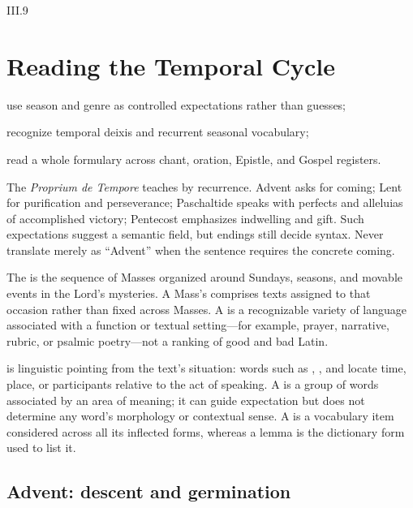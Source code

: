 \begin{courseunit}{III.9}
\chapter{Reading the Temporal Cycle}

\begin{learningobjectives}
  \item use season and genre as controlled expectations rather than guesses;
  \item recognize temporal deixis and recurrent seasonal vocabulary;
  \item read a whole formulary across chant, oration, Epistle, and Gospel registers.
\end{learningobjectives}

The \emph{Proprium de Tempore} teaches by recurrence. Advent asks for coming;
Lent for purification and perseverance; Paschaltide speaks with perfects and
alleluias of accomplished victory; Pentecost emphasizes indwelling and gift.
Such expectations suggest a semantic field, but endings still decide syntax.
Never translate  merely as ``Advent'' when the sentence requires
the concrete coming.

The  is the sequence of Masses organized around Sundays,
seasons, and movable events in the Lord's mysteries. A Mass's 
comprises texts assigned to that occasion rather than fixed across Masses. A
 is a recognizable variety of language associated with a
function or textual setting---for example, prayer, narrative, rubric, or
psalmic poetry---not a ranking of good and bad Latin.

 is linguistic pointing from the text's situation: words such as
, , and  locate time, place, or
participants relative to the act of speaking. A  is a
group of words associated by an area of meaning; it can guide expectation but
does not determine any word's morphology or contextual sense. A 
is a vocabulary item considered across all its inflected forms, whereas a
lemma is the dictionary form used to list it.

\section{Advent: descent and germination}

\begin{quote}


\end{quote}
\end{courseunit}

